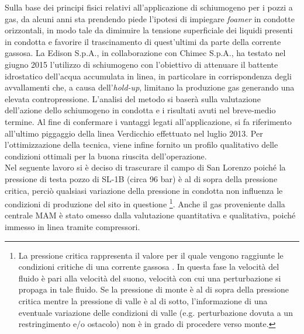 Sulla base dei principi fisici relativi all'applicazione di schiumogeno per i pozzi a gas, da alcuni anni sta prendendo piede l'ipotesi di impiegare \textit{foamer} in condotte orizzontali, in modo tale da diminuire la tensione superficiale dei liquidi presenti in condotta e favorire il trascinamento di quest'ultimi da parte della corrente gassosa. La Edison S.p.A., in collaborazione con Chimec S.p.A., ha testato nel giugno 2015 l'utilizzo di schiumogeno con l'obiettivo di attenuare il battente idrostatico dell'acqua accumulata in linea, in particolare in corrispondenza degli avvallamenti che, a causa dell'\textit{hold-up}, limitano la produzione gas generando una elevata contropressione. L'analisi del metodo si baserà sulla valutazione dell'azione dello schiumogeno in condotta e i risultati avuti nel breve-medio termine. Al fine di confermare i vantaggi legati all'applicazione, si fa riferimento all'ultimo piggaggio della linea Verdicchio effettuato nel luglio 2013. Per l'ottimizzazione della tecnica, viene infine fornito un profilo qualitativo delle condizioni ottimali per la buona riuscita dell'operazione.\\
Nel seguente lavoro si è deciso di trascurare il campo di San Lorenzo poiché la pressione di testa pozzo di SL-1B (circa 96 bar) è al di sopra della pressione critica, perciò qualsiasi variazione della pressione in condotta non influenza le condizioni di produzione del sito in questione
\footnote{La pressione critica rappresenta il valore per il quale vengono raggiunte le condizioni critiche di una corrente gassosa \parencite{sabetta2009gasdinamica}. In questa fase la velocità del fluido è pari alla velocità del suono, velocità con cui una perturbazione si propaga in tale fluido. Se la pressione di monte è al di sopra della pressione critica mentre la pressione di valle è al di sotto, l'informazione di una eventuale variazione delle condizioni di valle (e.g. perturbazione dovuta a un restringimento e/o ostacolo) non è in grado di procedere verso monte.}. Anche il gas proveniente dalla centrale MAM è stato omesso dalla valutazione quantitativa e qualitativa, poiché immesso in linea tramite compressori.
